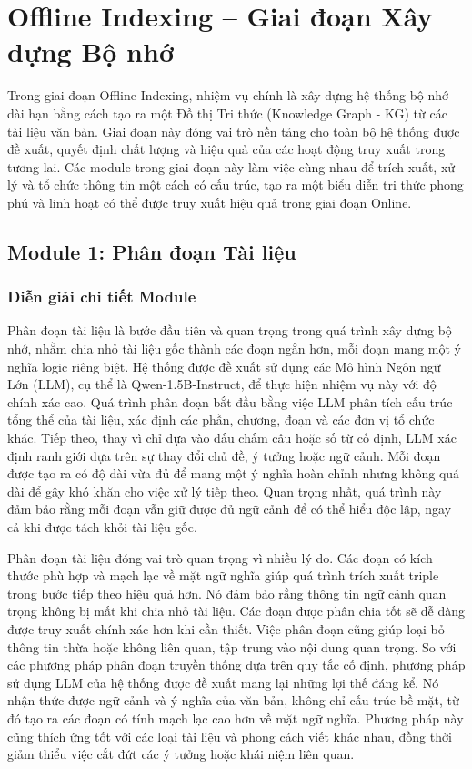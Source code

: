 \section{Offline Indexing – Giai đoạn Xây dựng Bộ nhớ}

Trong giai đoạn Offline Indexing, nhiệm vụ chính là xây dựng hệ thống bộ nhớ dài hạn bằng cách tạo ra một Đồ thị Tri thức (Knowledge Graph - KG) từ các tài liệu văn bản. Giai đoạn này đóng vai trò nền tảng cho toàn bộ hệ thống được đề xuất, quyết định chất lượng và hiệu quả của các hoạt động truy xuất trong tương lai. Các module trong giai đoạn này làm việc cùng nhau để trích xuất, xử lý và tổ chức thông tin một cách có cấu trúc, tạo ra một biểu diễn tri thức phong phú và linh hoạt có thể được truy xuất hiệu quả trong giai đoạn Online.

\subsection{Module 1: Phân đoạn Tài liệu}

\subsubsection{Diễn giải chi tiết Module}
Phân đoạn tài liệu là bước đầu tiên và quan trọng trong quá trình xây dựng bộ nhớ, nhằm chia nhỏ tài liệu gốc thành các đoạn ngắn hơn, mỗi đoạn mang một ý nghĩa logic riêng biệt. Hệ thống được đề xuất sử dụng các Mô hình Ngôn ngữ Lớn (LLM), cụ thể là Qwen-1.5B-Instruct, để thực hiện nhiệm vụ này với độ chính xác cao. Quá trình phân đoạn bắt đầu bằng việc LLM phân tích cấu trúc tổng thể của tài liệu, xác định các phần, chương, đoạn và các đơn vị tổ chức khác. Tiếp theo, thay vì chỉ dựa vào dấu chấm câu hoặc số từ cố định, LLM xác định ranh giới dựa trên sự thay đổi chủ đề, ý tưởng hoặc ngữ cảnh. Mỗi đoạn được tạo ra có độ dài vừa đủ để mang một ý nghĩa hoàn chỉnh nhưng không quá dài để gây khó khăn cho việc xử lý tiếp theo. Quan trọng nhất, quá trình này đảm bảo rằng mỗi đoạn vẫn giữ được đủ ngữ cảnh để có thể hiểu độc lập, ngay cả khi được tách khỏi tài liệu gốc.

Phân đoạn tài liệu đóng vai trò quan trọng vì nhiều lý do. Các đoạn có kích thước phù hợp và mạch lạc về mặt ngữ nghĩa giúp quá trình trích xuất triple trong bước tiếp theo hiệu quả hơn. Nó đảm bảo rằng thông tin ngữ cảnh quan trọng không bị mất khi chia nhỏ tài liệu. Các đoạn được phân chia tốt sẽ dễ dàng được truy xuất chính xác hơn khi cần thiết. Việc phân đoạn cũng giúp loại bỏ thông tin thừa hoặc không liên quan, tập trung vào nội dung quan trọng. So với các phương pháp phân đoạn truyền thống dựa trên quy tắc cố định, phương pháp sử dụng LLM của hệ thống được đề xuất mang lại những lợi thế đáng kể. Nó nhận thức được ngữ cảnh và ý nghĩa của văn bản, không chỉ cấu trúc bề mặt, từ đó tạo ra các đoạn có tính mạch lạc cao hơn về mặt ngữ nghĩa. Phương pháp này cũng thích ứng tốt với các loại tài liệu và phong cách viết khác nhau, đồng thời giảm thiểu việc cắt đứt các ý tưởng hoặc khái niệm liên quan.


